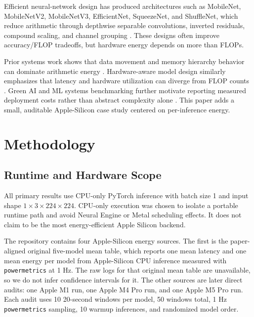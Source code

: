 \documentclass[conference]{IEEEtran}
\begin{document}
Efficient neural-network design has produced architectures such as MobileNet,
MobileNetV2, MobileNetV3, EfficientNet, SqueezeNet, and ShuffleNet, which
reduce arithmetic through depthwise separable convolutions, inverted
residuals, compound scaling, and channel grouping
\cite{mobilenet2017,mobilenetv22018,mobilenetv32019,efficientnet2019,
squeezenet2016,shufflenet2018}. These designs often improve accuracy/FLOP
tradeoffs, but hardware energy depends on more than FLOPs.

Prior systems work shows that data movement and memory hierarchy behavior can
dominate arithmetic energy \cite{horowitz2014,eyeriss2017}. Hardware-aware
model design similarly emphasizes that latency and hardware utilization can
diverge from FLOP counts \cite{hardwareaware2019,mnasnet2019,fbnet2019}.
Green AI and ML systems benchmarking further motivate reporting measured
deployment costs rather than abstract complexity alone
\cite{greenai2020,strubell2019,patterson2021,mlperf2020}. This paper adds a
small, auditable Apple-Silicon case study centered on per-inference energy.

\section{Methodology}

\subsection{Runtime and Hardware Scope}

All primary results use CPU-only PyTorch inference with batch size 1 and input
shape $1\times3\times224\times224$. CPU-only execution was chosen to isolate a
portable runtime path and avoid Neural Engine or Metal scheduling effects. It
does not claim to be the most energy-efficient Apple Silicon backend.

The repository contains four Apple-Silicon energy sources. The first is the
paper-aligned original five-model mean table, which reports one mean
latency and one mean energy per model from Apple-Silicon CPU inference
measured with \texttt{powermetrics} at 1 Hz. The raw logs for that original
mean table are unavailable, so we do not infer confidence intervals for it.
The other sources are later direct audits: one Apple M1 run, one Apple M4 Pro
run, and one Apple M5 Pro run. Each audit uses 10 20-second windows per
model, 50 windows total, 1 Hz \texttt{powermetrics} sampling, 10 warmup
inferences, and randomized model order.
\end{document}
